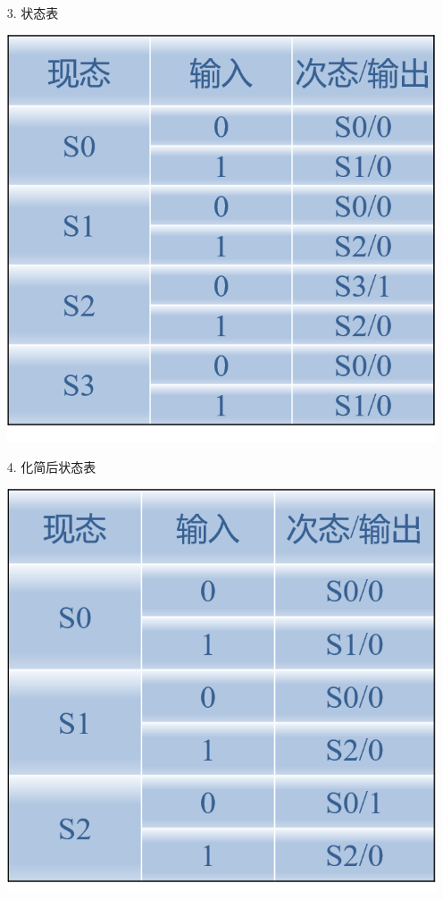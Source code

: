 \documentclass[UTF8]{ctexart}
\begin{document}
\begin{enumerate}
\begin{itemize}
              \item [3.] 状态表              \\
                    \begin{center}
                        \includegraphics[scale = 0.6]{3.png}
                        \label{fig:label}
                    \end{center}
              \item [4.] 化简后状态表              \\
                    \begin{center}
                        \includegraphics[scale = 0.6]{4.png}

\end{center}
\end{itemize}
\end{enumerate}
\end{document}

